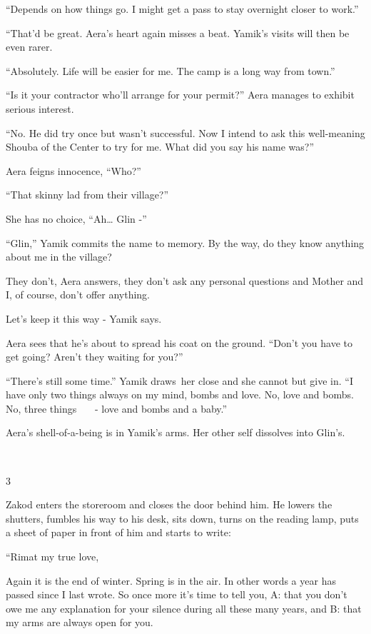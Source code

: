 \documentclass[letterpaper]{article}
\begin{document}
{}``Depends on how things go. I might get a pass to stay overnight closer to work.'' 

{}``That'd be great.{\textquotedbl} Aera's heart again misses a beat. Yamik's visits will then be even rarer. 

{}``Absolutely. Life will be easier for me. The camp is a long way from town.'' 

{}``Is it your contractor who'll arrange for your permit?'' Aera manages to exhibit serious interest. 

{}``No. He did try once but wasn't successful. Now I intend to ask this well-meaning Shouba of the Center to try for me.
What did you say his name was?'' 

Aera feigns innocence, ``Who?''~ 

{}``That skinny lad from their village?'' 

She has no choice, ``Ah{\dots} Glin -'' 

{}``Glin,'' Yamik commits the name to memory. {\textquotedbl}By the way, do they know anything about me in the
village?{\textquotedbl}

{\textquotedbl}They don't{\textquotedbl}, Aera answers, {\textquotedbl}they don't ask any personal questions and Mother
and I, of course, don't offer anything.{\textquotedbl}

{\textquotedbl}Let's keep it this way -{\textquotedbl} Yamik says.

Aera sees that he's about to spread his coat on the ground. ``Don't you have to get going? Aren't they waiting for
you?'' 

{}``There's still some time.'' Yamik draws~her close and she cannot but give in. ``I have only two things always on my
mind, bombs and love. No, love and bombs. No, three things \ \ \ {}- love and bombs and a baby.'' 

Aera's shell-of-a-being is in Yamik's arms.{ }Her other self dissolves into Glin's. 

~

3 

Zakod enters the storeroom and closes the door behind him. He lowers the shutters, fumbles his way to his desk, sits
down, turns on the reading lamp, puts a sheet of paper in front of him and starts to write:

{}``Rimat my true love,

Again it is the end of winter. Spring is in the air. In other words a year has passed since I last wrote. So once more
it's time to tell you, A: that you don't owe me any explanation for your silence during all these many years, and B:
that my arms are always open for you.
\end{document}

